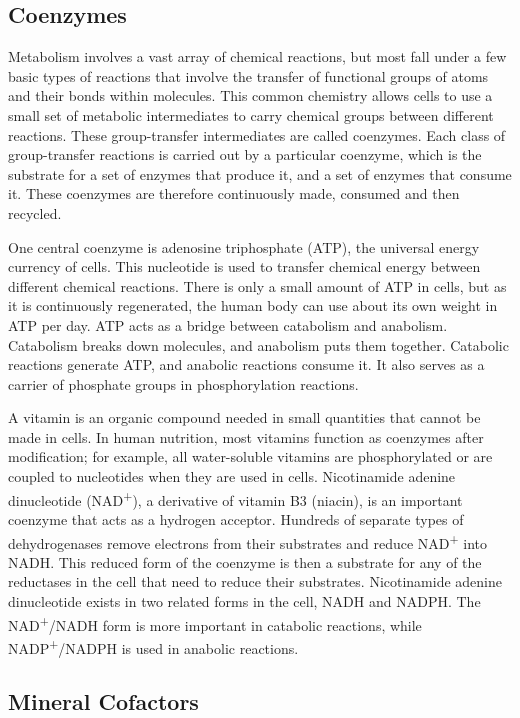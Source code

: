\hypertarget{coenzymes}{%
\subsection{Coenzymes}\label{coenzymes}}

Metabolism involves a vast array of chemical reactions, but most fall under a few basic types of reactions that involve the transfer of functional groups of atoms and their bonds within molecules. This common chemistry allows cells to use a small set of metabolic intermediates to carry chemical groups between different reactions. These group-transfer intermediates are called coenzymes. Each class of group-transfer reactions is carried out by a particular coenzyme, which is the substrate for a set of enzymes that produce it, and a set of enzymes that consume it. These coenzymes are therefore continuously made, consumed and then recycled.

One central coenzyme is adenosine triphosphate (ATP), the universal energy currency of cells. This nucleotide is used to transfer chemical energy between different chemical reactions. There is only a small amount of ATP in cells, but as it is continuously regenerated, the human body can use about its own weight in ATP per day. ATP acts as a bridge between catabolism and anabolism. Catabolism breaks down molecules, and anabolism puts them together. Catabolic reactions generate ATP, and anabolic reactions consume it. It also serves as a carrier of phosphate groups in phosphorylation reactions.

A vitamin is an organic compound needed in small quantities that cannot be made in cells. In human nutrition, most vitamins function as coenzymes after modification; for example, all water-soluble vitamins are phosphorylated or are coupled to nucleotides when they are used in cells. Nicotinamide adenine dinucleotide (NAD\textsuperscript{+}), a derivative of vitamin B3 (niacin), is an important coenzyme that acts as a hydrogen acceptor. Hundreds of separate types of dehydrogenases remove electrons from their substrates and reduce NAD\textsuperscript{+} into NADH. This reduced form of the coenzyme is then a substrate for any of the reductases in the cell that need to reduce their substrates. Nicotinamide adenine dinucleotide exists in two related forms in the cell, NADH and NADPH. The NAD\textsuperscript{+}/NADH form is more important in catabolic reactions, while NADP\textsuperscript{+}/NADPH is used in anabolic reactions.

\hypertarget{mineral-cofactors}{%
\subsection{Mineral Cofactors}\label{mineral-cofactors}}

